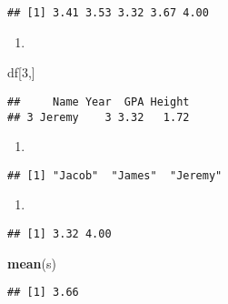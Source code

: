 \documentclass[
]{article}
\newenvironment{Shaded}{\begin{snugshade}}{\end{snugshade}}
\newcommand{\DecValTok}[1]{\textcolor[rgb]{0.00,0.00,0.81}{#1}}
\newcommand{\FloatTok}[1]{\textcolor[rgb]{0.00,0.00,0.81}{#1}}
\newcommand{\FunctionTok}[1]{\textcolor[rgb]{0.13,0.29,0.53}{\textbf{#1}}}
\newcommand{\NormalTok}[1]{#1}
\newcommand{\OtherTok}[1]{\textcolor[rgb]{0.56,0.35,0.01}{#1}}
\newcommand{\SpecialCharTok}[1]{\textcolor[rgb]{0.81,0.36,0.00}{\textbf{#1}}}
\providecommand{\tightlist}{%
  \setlength{\itemsep}{0pt}\setlength{\parskip}{0pt}}
\begin{document}
\begin{verbatim}
## [1] 3.41 3.53 3.32 3.67 4.00
\end{verbatim}

\begin{enumerate}
\def\labelenumi{\arabic{enumi})}
\setcounter{enumi}{2}
\tightlist
\item
\end{enumerate}

\begin{Shaded}
\begin{Highlighting}[]
\NormalTok{df[}\DecValTok{3}\NormalTok{,]}
\end{Highlighting}
\end{Shaded}

\begin{verbatim}
##     Name Year  GPA Height
## 3 Jeremy    3 3.32   1.72
\end{verbatim}

\begin{enumerate}
\def\labelenumi{\arabic{enumi})}
\setcounter{enumi}{3}
\tightlist
\item
\end{enumerate}

\begin{Shaded}
\end{Shaded}

\begin{verbatim}
## [1] "Jacob"  "James"  "Jeremy"
\end{verbatim}

\begin{enumerate}
\def\labelenumi{\arabic{enumi})}
\setcounter{enumi}{4}
\tightlist
\item
\end{enumerate}

\begin{Shaded}
\end{Shaded}

\begin{verbatim}
## [1] 3.32 4.00
\end{verbatim}

\begin{Shaded}
\begin{Highlighting}[]
\FunctionTok{mean}\NormalTok{(s)}
\end{Highlighting}
\end{Shaded}

\begin{verbatim}
## [1] 3.66
\end{verbatim}
\end{document}
